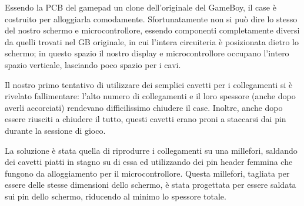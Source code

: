\documentclass[hidelinks,12pt]{article}
\begin{document}
Essendo la PCB del gamepad un clone dell'originale del GameBoy, il case è
costruito per alloggiarla comodamente. Sfortunatamente non si può dire lo stesso
del nostro schermo e microcontrollore, essendo componenti completamente diversi
da quelli trovati nel GB originale, in cui l'intera circuiteria è posizionata
dietro lo schermo; in questo spazio il nostro display e microcontrollore
occupano l'intero spazio verticale, lasciando poco spazio per i cavi.

Il nostro primo tentativo di utilizzare dei semplici cavetti per i collegamenti
si è rivelato fallimentare: l'alto numero di collegamenti e il loro spessore
(anche dopo averli accorciati) rendevano difficilissimo chiudere il case.
Inoltre, anche dopo essere riusciti a chiudere il tutto, questi cavetti erano
proni a staccarsi dai pin durante la sessione di gioco.

La soluzione è stata quella di riprodurre i collegamenti su una millefori,
saldando dei cavetti piatti in stagno su di essa ed utilizzando dei pin header
femmina che fungono da alloggiamento per il microcontrollore.
Questa millefori, tagliata per essere delle stesse dimensioni dello schermo, è
stata progettata per essere saldata sui pin dello schermo, riducendo al minimo
lo spessore totale.
\end{document}
